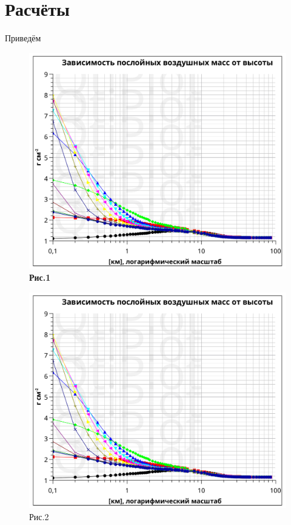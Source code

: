 \documentclass[a4paper,12pt]{article}
\theoremstyle{plain}
\theoremstyle{definition}
\theoremstyle{remark}
\begin{document}
\section{Расчёты}
Приведём
\begin{figure}[h!]
\begin{minipage}[b]{0.45\textwidth}
    \includegraphics[width=\textwidth]{../experimental_data/2022-12-11_11-18.png}
    \textbf{Рис.1}
\end{minipage}
\begin{minipage}[b]{0.45\textwidth}
    \includegraphics[width=\textwidth]{../experimental_data/2022-12-11_11-18.png}
    Рис.2
\end{minipage}
\end{figure}
\end{document}
